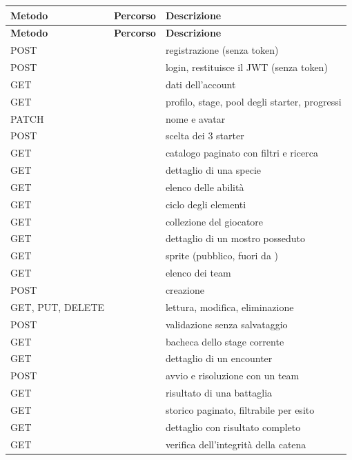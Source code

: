 \documentclass[11pt,a4paper]{report}
\begin{document}
\begin{xltabular}{\linewidth}{@{}P{2.5cm}P{5.4cm}L@{}}
\toprule
\textbf{Metodo} & \textbf{Percorso} & \textbf{Descrizione} \\
\midrule
\endfirsthead
\toprule
\textbf{Metodo} & \textbf{Percorso} & \textbf{Descrizione} \\
\midrule
\endhead
\bottomrule
\endfoot
POST &  & registrazione (senza token) \\
POST &  & login, restituisce il JWT (senza token) \\
GET &  & dati dell'account \\
\midrule
GET &  & profilo, stage, pool degli starter, progressi \\
PATCH &  & nome e avatar \\
POST &  & scelta dei 3 starter \\
\midrule
GET &  & catalogo paginato con filtri e ricerca \\
GET &  & dettaglio di una specie \\
GET &  & elenco delle abilità \\
GET &  & ciclo degli elementi \\
GET &  & collezione del giocatore \\
GET &  & dettaglio di un mostro posseduto \\
GET &  & sprite (pubblico, fuori da ) \\
\midrule
GET &  & elenco dei team \\
POST &  & creazione \\
GET, PUT, DELETE &  & lettura, modifica, eliminazione \\
POST &  & validazione senza salvataggio \\
\midrule
GET &  & bacheca dello stage corrente \\
GET &  & dettaglio di un encounter \\
POST &  & avvio e risoluzione con un team \\
GET &  & risultato di una battaglia \\
\midrule
GET &  & storico paginato, filtrabile per esito \\
GET &  & dettaglio con risultato completo \\
GET &  & verifica dell'integrità della catena \\
\end{xltabular}
\end{document}
